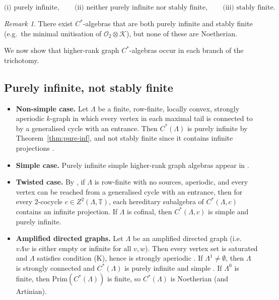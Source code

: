 \documentclass[12pt]{amsart}
\theoremstyle{plain}
\theoremstyle{definition}
\theoremstyle{remark}
\newtheorem{remark}[theorem]{Remark}
\newcommand{\Prim}{\mathrm{Prim}}
\begin{document}
\[
\text{(i) purely infinite},\qquad
\text{(ii) neither purely infinite nor stably finite},\qquad
\text{(iii) stably finite}.
\]



\begin{remark}
There exist $C^*$-algebras that are both purely infinite and stably finite
(e.g.\ the minimal unitisation of $\mathcal O_2\otimes\mathcal K$), but none of
these are Noetherian.
\end{remark}

We now show that higher-rank graph $C^*$-algebras occur in each branch of the
trichotomy.

\subsection{Purely infinite, not stably finite}

\begin{itemize}
\item
\textbf{Non-simple case.}
Let $\Lambda$ be a finite, row-finite, locally convex, strongly aperiodic
$k$-graph in which every vertex in each maximal tail is connected to by a
generalised cycle with an entrance. Then $C^*(\Lambda)$ is purely infinite by
Theorem~\ref{thm:pure-inf}, and not stably finite since it contains infinite
projections \cite[Proposition~2.7]{PSS4}.

\item
\textbf{Simple case.}
Purely infinite simple higher-rank graph algebras appear in
\cite[\S7.3]{CaHS}.

\item
\textbf{Twisted case.}
By \cite[Proposition~5.7]{KPS5}, if $\Lambda$ is row-finite with no sources,
aperiodic, and every vertex can be reached from a generalised cycle with an
entrance, then for every $2$-cocycle $c\in Z^2(\Lambda,\mathbb T)$, each
hereditary subalgebra of $C^*(\Lambda,c)$ contains an infinite projection.
If $\Lambda$ is cofinal, then $C^*(\Lambda,c)$ is simple and purely infinite.

\item
\textbf{Amplified directed graphs.}
Let $\Lambda$ be an amplified directed graph (i.e.\ $v\Lambda w$ is either
empty or infinite for all $v,w$). Then every vertex set is saturated and
$\Lambda$ satisfies condition (K), hence is strongly aperiodic
\cite[Lemma~3.2]{KaP}. If $\Lambda^1\neq\emptyset$, then $\Lambda$ is strongly
connected and $C^*(\Lambda)$ is purely infinite and simple
\cite[\S6.1]{ERS}. If $\Lambda^0$ is finite, then $\Prim(C^*(\Lambda))$ is
finite, so $C^*(\Lambda)$ is Noetherian (and Artinian).
\end{itemize}
\end{document}
